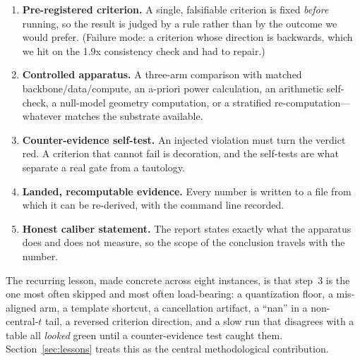 \begin{enumerate}
  \item \textbf{Pre-registered criterion.} A single, falsifiable criterion is fixed
  \emph{before} running, so the result is judged by a rule rather than by the
  outcome we would prefer. (Failure mode: a criterion whose direction is
  backwards, which we hit on the 1.9x consistency check and had to repair.)
  \item \textbf{Controlled apparatus.} A three-arm comparison with matched
  backbone/data/compute, an a-priori power calculation, an arithmetic self-check,
  a null-model geometry computation, or a stratified re-computation---whatever
  matches the substrate available.
  \item \textbf{Counter-evidence self-test.} An injected violation must turn the
  verdict red. A criterion that cannot fail is decoration, and the self-tests are
  what separate a real gate from a tautology.
  \item \textbf{Landed, recomputable evidence.} Every number is written to a file
  from which it can be re-derived, with the command line recorded.
  \item \textbf{Honest caliber statement.} The report states exactly what the
  apparatus does and does not measure, so the scope of the conclusion travels with
  the number.
\end{enumerate}

The recurring lesson, made concrete across eight instances, is that step~3 is the
one most often skipped and most often load-bearing: a quantization floor, a
mis-aligned arm, a template shortcut, a cancellation artifact, a ``nan'' in a
non-central-$t$ tail, a reversed criterion direction, and a slow run that
disagrees with a table all \emph{looked} green until a counter-evidence test
caught them. Section~\ref{sec:lessons} treats this as the central methodological
contribution.